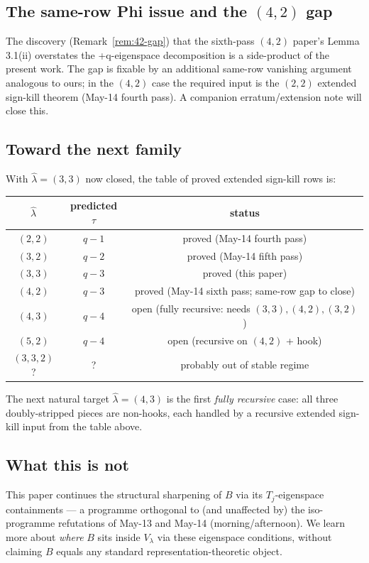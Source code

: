 \documentclass[11pt]{article}
\theoremstyle{definition}
\newcommand{\hatl}{\widehat\lambda}
\begin{document}
\subsection{The same-row Phi issue and the $(4, 2)$ gap}

The discovery (Remark~\ref{rem:42-gap}) that the sixth-pass $(4, 2)$
paper's Lemma 3.1(ii) overstates the +q-eigenspace decomposition is a
side-product of the present work.  The gap is fixable by an additional
same-row vanishing argument analogous to ours; in the $(4, 2)$ case the
required input is the $(2, 2)$ extended sign-kill theorem (May-14
fourth pass).  A companion erratum/extension note will close this.

\subsection{Toward the next family}

With $\hatl = (3, 3)$ now closed, the table of proved extended sign-kill
rows is:
\begin{center}
\begin{tabular}{c|c|c}
$\hatl$ & predicted $\tau$ & status \\
\hline
$(2, 2)$ & $q - 1$ & proved (May-14 fourth pass) \\
$(3, 2)$ & $q - 2$ & proved (May-14 fifth pass) \\
$(3, 3)$ & $q - 3$ & proved (this paper) \\
$(4, 2)$ & $q - 3$ & proved (May-14 sixth pass; same-row gap to close) \\
\hline
$(4, 3)$ & $q - 4$ & open (fully recursive: needs $(3, 3), (4, 2), (3, 2)$) \\
$(5, 2)$ & $q - 4$ & open (recursive on $(4, 2)$ + hook) \\
$(3, 3, 2)$? & ? & probably out of stable regime
\end{tabular}
\end{center}
The next natural target $\hatl = (4, 3)$ is the first \emph{fully
recursive} case: all three doubly-stripped pieces are non-hooks, each
handled by a recursive extended sign-kill input from the table above.

\subsection{What this is not}

This paper continues the structural sharpening of $B$ via its
$T_j$-eigenspace containments --- a programme orthogonal to (and
unaffected by) the iso-programme refutations of May-13 and May-14
(morning/afternoon).  We learn more about \emph{where} $B$ sits inside
$V_\lambda$ via these eigenspace conditions, without claiming $B$ equals
any standard representation-theoretic object.
\end{document}

